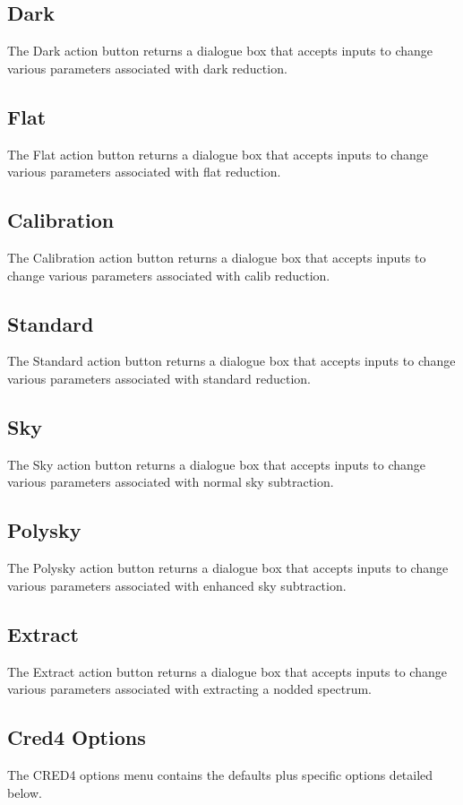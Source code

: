 \documentclass[a4paper]{book}
\renewcommand{\_}{{\tt\char'137}}
\begin{document}
\subsection{Dark}
The {\sf Dark} action button returns a dialogue box that
accepts inputs to change various parameters associated with {\sc dark} reduction.

\subsection{Flat}
The {\sf Flat} action button returns a dialogue box that
accepts inputs to change various parameters associated with {\sc flat} reduction.

\subsection{Calibration}
The {\sf Calibration} action button returns a dialogue box that
accepts inputs to change various parameters associated with {\sc calib} reduction.

\subsection{Standard}
The {\sf Standard} action button returns a dialogue box that
accepts inputs to change various parameters associated with {\sc standard} reduction.

\subsection{Sky}
The {\sf Sky} action button returns a dialogue box that
accepts inputs to change various parameters associated with normal sky subtraction.

\subsection{Polysky}
The {\sf Polysky} action button returns a dialogue box that
accepts inputs to change various parameters associated with enhanced sky subtraction.

\subsection{Extract}
The {\sf Extract} action button returns a dialogue box that
accepts inputs to change various parameters associated with extracting a nodded spectrum.

\subsection{Cred4 Options}
The CRED4 options menu contains the defaults plus specific options detailed below.
\end{document}
